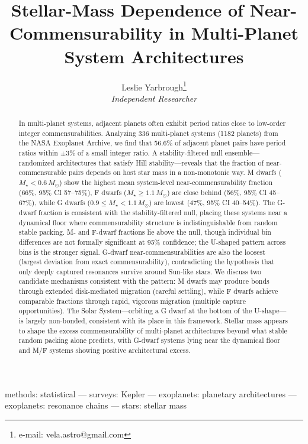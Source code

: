 \documentclass[twocolumn,usenatbib]{mnras}
\title[]{Stellar-Mass Dependence of Near-Commensurability in Multi-Planet
System Architectures}
\author[]{Leslie Yarbrough\thanks{e-mail: vela.astro@gmail.com}
\\[4pt]
\textit{Independent Researcher}}
\begin{document}
\label{firstpage}

\maketitle

\begin{abstract}
In multi-planet systems, adjacent planets often exhibit period ratios close to
low-order integer commensurabilities. Analyzing 336 multi-planet systems (1182
planets) from the NASA Exoplanet Archive, we find that 56.6\% of adjacent
planet pairs have period ratios within $\pm 3\%$ of a small integer ratio. A
stability-filtered null ensemble---randomized architectures that satisfy Hill
stability---reveals that the fraction of near-commensurable pairs depends on
host star mass in a non-monotonic way. M dwarfs
($M_\star < 0.6\,M_\odot$) show the highest mean system-level near-commensurability
fraction (66\%, 95\% CI 57--75\%), F dwarfs ($M_\star \geq 1.1\,M_\odot$) are
close behind (56\%, 95\% CI 45--67\%), while G dwarfs
($0.9 \leq M_\star < 1.1\,M_\odot$) are lowest (47\%, 95\% CI 40--54\%).
The G-dwarf fraction is consistent with the stability-filtered null, placing
these systems near a dynamical floor where commensurability structure is
indistinguishable from random stable packing. M- and F-dwarf fractions lie
above the null, though individual bin differences are not formally significant
at 95\% confidence; the U-shaped pattern across bins is the stronger signal.
G-dwarf near-commensurabilities are also the loosest (largest deviation from
exact commensurability), contradicting the hypothesis that only deeply captured
resonances survive around Sun-like stars. We discuss two candidate mechanisms
consistent with the pattern: M dwarfs may produce bonds through extended
disk-mediated migration (careful settling), while F dwarfs achieve comparable
fractions through rapid, vigorous migration (multiple capture opportunities).
The Solar System---orbiting a G dwarf at the bottom of the U-shape---is largely
non-bonded, consistent with its place in this framework. Stellar mass appears to
shape the excess commensurability of multi-planet architectures beyond what
stable random packing alone predicts, with G-dwarf systems lying near the
dynamical floor and M/F systems showing positive architectural excess.
\end{abstract}

\begin{keywords}
methods: statistical --- surveys: Kepler --- exoplanets: planetary architectures --- exoplanets: resonance chains --- stars: stellar mass
\end{keywords}
\end{document}
